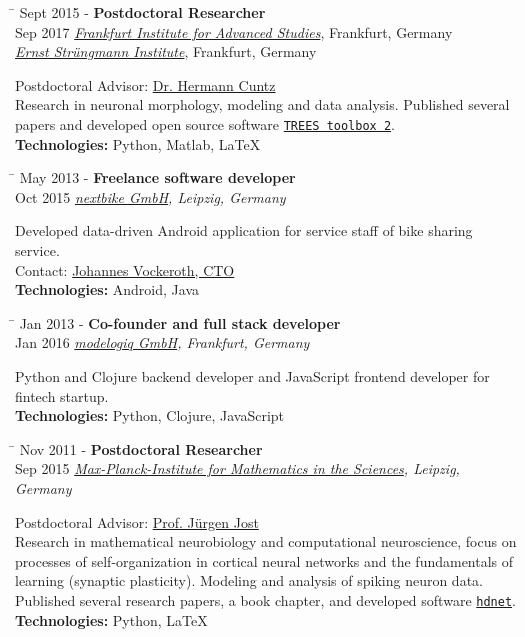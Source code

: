 \documentclass[10pt]{article} %
\newlength{\smallertextwidth}
\newcommand{\job}[5]{
\begin{tabbing}
\hspace{2.2cm} \= \kill
{#1} \> \textbf{#3}\\
{#2} \>\+ \textit{#4}\\[3pt]
\begin{minipage}{\smallertextwidth}
\vspace{2mm}
#5
\end{minipage}
\end{tabbing}
\vspace{2mm}
}
\begin{document}
\begin{tabbing}
  \hspace{2.2cm} \= \kill
  {Sept 2015 -} \> \textbf{Postdoctoral Researcher}\\
  {Sep 2017} \> \textit{\href{https://fias.institute}{Frankfurt Institute for Advanced Studies}}, Frankfurt, Germany\\
  \>\+ \textit{\href{http://www.esi-frankfurt.de}{Ernst Strüngmann Institute}}, Frankfurt, Germany\\[3pt]
  \begin{minipage}{\smallertextwidth}
    \vspace{2mm}
    Postdoctoral Advisor: \href{https://www.fias.science/de/neurowissenschaften/gruppen/hermann-cuntz/}{Dr. Hermann Cuntz}\\
    Research in neuronal morphology, modeling and data analysis. Published several papers and developed
    open source software \href{https://www.treestoolbox.org/}{\texttt{TREES toolbox 2}}.\\[5pt]
    \textbf{Technologies:} Python, Matlab, LaTeX  
  \end{minipage}
\end{tabbing}
\vspace{2mm}
  

\job
{May 2013 -}{Oct 2015}
{Freelance software developer}
{\href{https://nextbike.com}{nextbike GmbH}\textup{, Leipzig, Germany}}
{
  Developed data-driven Android application for service staff of bike sharing service.\\
  Contact: \href{https://www.linkedin.com/in/johannes-vockeroth-8885709a/}{Johannes Vockeroth, CTO}\\[5pt]
  \textbf{Technologies:} Android, Java
}
  
\job
{Jan 2013 -}{Jan 2016}
{Co-founder and full stack developer}
{\href{https://modelogiq.com}{modelogiq GmbH}\textup{, Frankfurt, Germany}}
{
  Python and Clojure backend developer and JavaScript frontend developer for fintech startup.\\[5pt]
  \textbf{Technologies:} Python, Clojure, JavaScript
}

\job
{Nov 2011 -}{Sep 2015}
{Postdoctoral Researcher}
{\href{https://www.mis.mpg.de}{Max-Planck-Institute for Mathematics in the Sciences}\textup{, Leipzig, Germany}}
{
  Postdoctoral Advisor: \href{https://www.mis.mpg.de/de/jjost/juergen-jost.html}{Prof. Jürgen Jost}\\
  Research in mathematical neurobiology and computational neuroscience, focus on processes of self-organization
  in cortical neural networks and the fundamentals of learning (synaptic plasticity). Modeling and analysis
  of spiking neuron data. Published several research papers, a book chapter, and developed software
  \texttt{\href{https://github.com/team-hdnet/hdnet}{hdnet}}.\\[5pt]
  \textbf{Technologies:} Python, LaTeX
}
\end{document}
